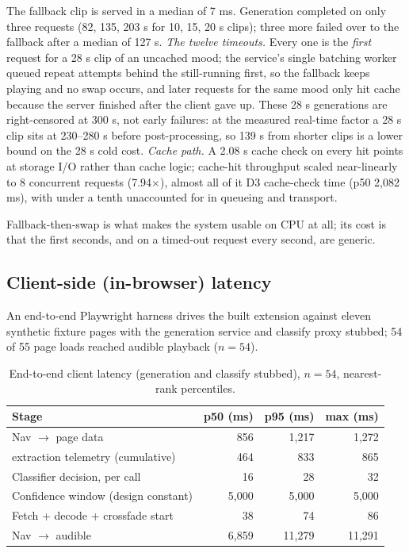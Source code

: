 \documentclass[conference]{IEEEtran}
\let\IEEEoriginalcaption\caption
\renewcommand{\caption}[1]{\IEEEoriginalcaption{\footnotesize #1}}
\begin{document}
The fallback clip is served in a median of 7 ms. Generation completed on
only three requests (82, 135, 203 s for 10, 15, 20 s clips); three more
failed over to the fallback after a median of 127 s. \emph{The twelve
timeouts.} Every one is the \emph{first} request for a 28 s clip of an
uncached mood; the service's single batching worker queued repeat
attempts behind the still-running first, so the fallback keeps playing
and no swap occurs, and later requests for the same mood only hit cache
because the server finished after the client gave up. These 28 s
generations are right-censored at 300 s, not early failures: at the
measured real-time factor a 28 s clip sits at 230--280 s before
post-processing, so 139 s from shorter clips is a lower bound on the
28 s cold cost. \emph{Cache path.} A 2.08 s cache check on every hit
points at storage I/O rather than cache logic; cache-hit throughput
scaled near-linearly to 8 concurrent requests (7.94$\times$), almost
all of it D3 cache-check time (p50 2,082 ms), with under a tenth
unaccounted for in queueing and transport.

Fallback-then-swap is what makes the system usable on CPU at all; its
cost is that the first seconds, and on a timed-out request every second,
are generic.

\subsection{Client-side (in-browser) latency}
\label{sec:res-e2e-latency}

An end-to-end Playwright harness drives the built extension against
eleven synthetic fixture pages with the generation service and classify
proxy stubbed; 54 of 55 page loads reached audible playback ($n=54$).

\begin{table}[t]
\caption{End-to-end client latency (generation and classify stubbed),
$n=54$, nearest-rank percentiles.}
\label{tab:e2e-latency}
\begin{center}
\scriptsize
\begin{tabular}{p{3.3cm}rrr}
\toprule
\textbf{Stage} & \textbf{p50 (ms)} & \textbf{p95 (ms)} & \textbf{max (ms)} \\
\midrule
Nav $\to$ page data & 856 & 1{,}217 & 1{,}272 \\
\quad extraction telemetry (cumulative) & 464 & 833 & 865 \\
Classifier decision, per call & 16 & 28 & 32 \\
Confidence window (design constant) & 5{,}000 & 5{,}000 & 5{,}000 \\
Fetch + decode + crossfade start & 38 & 74 & 86 \\
\midrule
Nav $\to$ audible & 6{,}859 & 11{,}279 & 11{,}291 \\
\bottomrule
\end{tabular}
\end{center}
\end{table}
\end{document}
